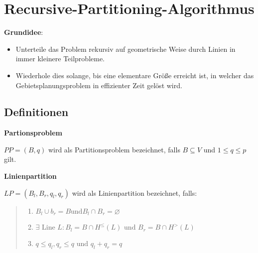 
  \section{Recursive-Partitioning-Algorithmus} %
  \label{sec:recursive_partitioning_algorithmus}

    \par {\color{blue}{(Bsp: Aufgabe 19)}}

    \par \textbf{Grundidee}:
      \begin{itemize}
         \item Unterteile das Problem rekursiv auf geometrische Weise durch Linien in immer kleinere Teilprobleme.
         \item Wiederhole dies solange, bis eine elementare Größe erreicht ist, in welcher das Gebietsplanungsproblem in effizienter Zeit gelöst wird.
       \end{itemize} 

    \subsection{Definitionen} %
    \label{sub:definitionen}

      \par \textbf{Partionsproblem}

      \par $PP = (B, q)$ wird als Partitionsproblem bezeichnet, falls $B \subseteq V$ und $1 \leq q \leq p$ gilt.\\
    
      \par \textbf{Linienpartition}

      \par $LP = (B_l, B_r, q_l, q_r)$ wird als Linienpartition bezeichnet, falls:
        \begin{quote}
          \begin{enumerate}
            \item $B_l \cup b_r = B \text{und} B_l \cap B_r = \varnothing$
            \item $\exists \text{ Line } L: B_l = B \cap H^{\leq}(L) \text{ und } B_r = B \cap H^{>}(L)$
            \item $q \leq q_l, q_r \leq q \text{ und } q_l + q_r = q$
          \end{enumerate}
        \end{quote}


